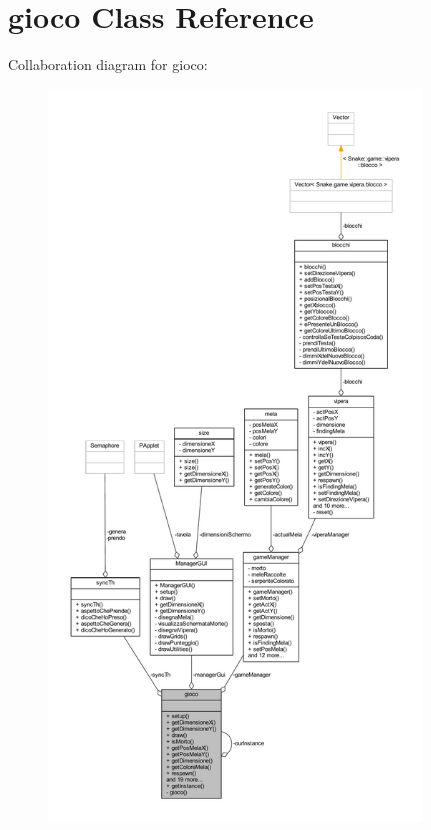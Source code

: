 \hypertarget{class_snake_1_1game_1_1gioco}{}\section{gioco Class Reference}
\label{class_snake_1_1game_1_1gioco}


Collaboration diagram for gioco\+:
\nopagebreak
\begin{figure}[H]
\begin{center}
\leavevmode
\includegraphics[height=550pt]{class_snake_1_1game_1_1gioco__coll__graph}
\end{center}
\end{figure}
